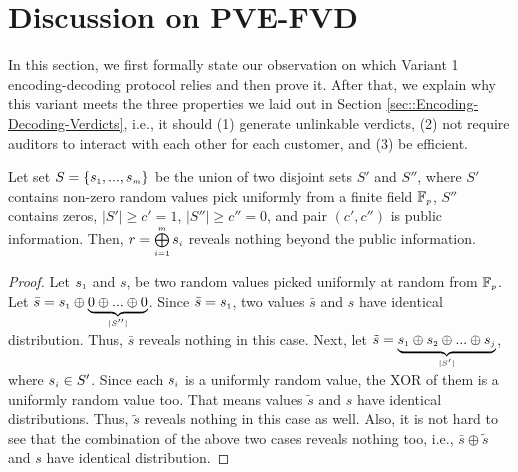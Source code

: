 

\clearpage

\section{Discussion on PVE-FVD}\label{sec::Variant-1-Theorem-proof}
In this section, we first formally state our observation on which  Variant 1 encoding-decoding protocol relies and then prove it. After that, we explain why this variant meets the three properties we laid out in Section \ref{sec::Encoding-Decoding-Verdicts}, i.e., it should (1) generate unlinkable verdicts, (2) not require auditors to interact with each other for each customer, and (3) be efficient.

\vspace{-3mm}

\begin{theorem}\label{set-xor}
Let set $S=\{s_{\scriptscriptstyle 1},..., s_{\scriptscriptstyle m}\}$ be the union of  two disjoint sets $S'$ and $S''$, where $S'$ contains non-zero random values pick uniformly  from a finite field $\mathbb{F}_{\scriptscriptstyle p}$, $S''$ contains zeros, $|S'|\geq c'=1$, $|S''|\geq c''=0$, and pair $(c',c'')$ is public information. Then, $r= \bigoplus\limits^{\scriptscriptstyle m}_{\scriptscriptstyle i=1} s_{\scriptscriptstyle i}$ reveals nothing beyond the public information.  
\end{theorem}

\vspace{-3mm}
\begin{proof}
Let $s_{\scriptscriptstyle 1}$ and $s$, be two random values picked uniformly at random from $\mathbb{F}_{\scriptscriptstyle p}$. Let $\bar s=s_{\scriptscriptstyle 1}\oplus \underbrace{0\oplus... \oplus 0}_{\scriptscriptstyle |S''|}$. Since  $\bar s=s_{\scriptscriptstyle 1}$, two values $\bar s$ and $s$ have identical distribution. Thus, $\bar s$ reveals nothing in this case. Next, let $\tilde s=\underbrace{ s_{\scriptscriptstyle 1}\oplus s_{\scriptscriptstyle 2}\oplus... \oplus s_{\scriptscriptstyle j}}_{\scriptscriptstyle |S'|}$, where $s_{\scriptscriptstyle i}\in S'$. Since each $s_{\scriptscriptstyle i}$ is a uniformly random value,  the XOR of them is a uniformly random value too. That means values $\tilde s$ and $s$ have identical distributions. Thus, $\tilde s$ reveals nothing in this case as well. Also, it is not hard to see that the combination of the above two cases reveals nothing too, i.e., $\bar s\oplus \tilde s$ and $s$ have identical distribution. 
%
\end{proof}

\vspace{-2mm}

